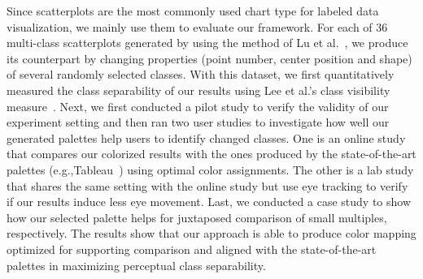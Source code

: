 Since scatterplots are the most commonly used chart type for labeled data visualization, we mainly use them to evaluate our framework. For each of 36 multi-class scatterplots generated by using the method of Lu et al.~\cite{Lu21}, we produce its counterpart by changing properties (point number, center position and shape) of several randomly selected classes. With this dataset, we first quantitatively measured the class separability  of our results using Lee et al.'s class visibility measure~\cite{lee2013perceptually}.
Next, we first conducted a pilot study to verify the validity of our experiment setting and then
ran two user studies to investigate how well our generated palettes help users to identify changed classes. One is an online study that compares our colorized results with the ones produced by the state-of-the-art palettes (e.g.,Tableau~\cite{tableau}) using optimal color assignments. The other is a lab study that shares the same setting with the online study but use eye tracking to verify if our results induce less eye movement.
Last, we conducted a case study to show how our selected palette helps for juxtaposed comparison of small multiples, respectively.
The results show that our approach is able to produce color mapping optimized for supporting comparison and aligned with the state-of-the-art palettes in maximizing perceptual class separability.

